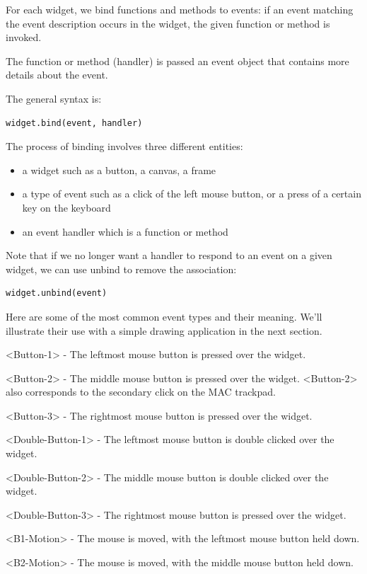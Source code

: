 \documentclass{article}
\begin{document}
For each widget, we bind functions and methods to events:  if an event matching the event description occurs in the widget, the given function or method is invoked.

The function or method (handler) is passed an event object that contains more details about the event.

The general syntax is:

\begin{lstlisting}
widget.bind(event, handler)
\end{lstlisting}

The process of binding involves three different entities: 

\begin{itemize}
\item a widget such as a button, a canvas, a frame
\item a type of event such as a click of the left mouse button, or a press of a certain key on the keyboard
\item an event handler which is a function or method
\end{itemize}

Note that if we no longer want a handler to respond to an event on a given widget, we can use unbind to remove the association:

\begin{lstlisting}
widget.unbind(event)
\end{lstlisting}

Here are some of the most common event types and their meaning.  We'll illustrate their use with a simple drawing application in the next section.

<Button-1> - The leftmost mouse button is pressed over the widget.  

<Button-2> - The middle mouse button is pressed over the widget.  <Button-2> also corresponds to the secondary click on the MAC trackpad. 

<Button-3> - The rightmost mouse button is pressed over the widget.

<Double-Button-1> - The leftmost mouse button is double clicked over the widget.  

<Double-Button-2> - The middle mouse button is double clicked over the widget.  

<Double-Button-3> - The rightmost mouse button is pressed over the widget.

<B1-Motion> - The mouse is moved, with the leftmost mouse button held down.

<B2-Motion> - The mouse is moved, with the middle mouse button held down.
\end{document}
